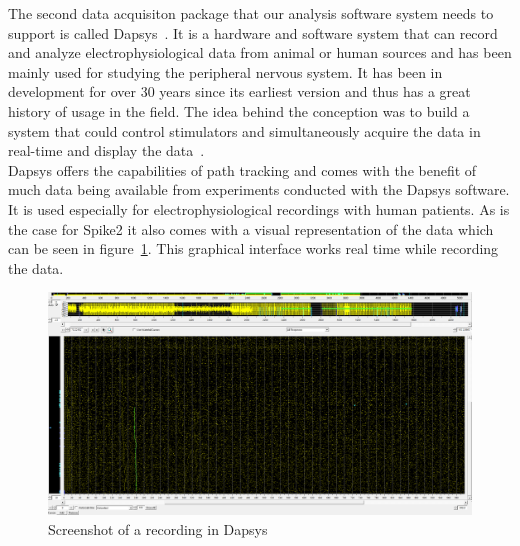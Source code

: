 The second data acquisiton package that our analysis software system needs to support is called Dapsys~\cite{dapsys}. It is a hardware and software system that can record and analyze electrophysiological data from animal or human sources and has been mainly used for studying the peripheral nervous system. It has been in development for over 30 years since its earliest version and thus has a great history of usage in the field. The idea behind the conception was to build a system that could control stimulators and simultaneously acquire the data in real-time and display the data~\cite{dapsysArticle}.\\
Dapsys offers the capabilities of path tracking and comes with the benefit of much data being available from experiments conducted with the Dapsys software. It is used especially for electrophysiological recordings with human patients. As is the case for Spike2 it also comes with a visual representation of the data which can be seen in figure~\ref{fig:dapsys}. This graphical interface works real time while recording the data.\\
\begin{figure}
	\includegraphics[width = \textwidth]{src/pic/Dapsys_sc}
	\caption{Screenshot of a recording in Dapsys}
	\label{fig:dapsys}
\end{figure}


